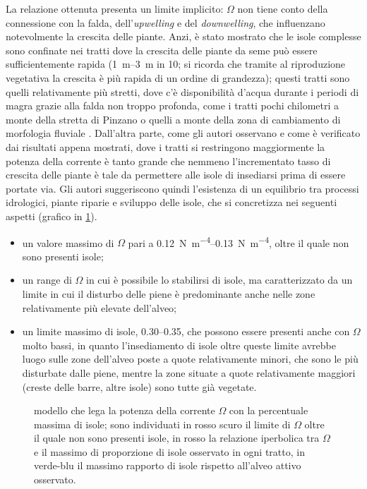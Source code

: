 La relazione ottenuta presenta un limite implicito: $\Omega$ non tiene conto della connessione con la falda, dell'\emph{upwelling} e del \emph{downwelling}, che influenzano notevolmente la crescita delle piante.
Anzi, è stato mostrato che le isole complesse sono confinate nei tratti dove la crescita delle piante da seme può essere sufficientemente rapida (\SIrange[range-phrase={-}]{1}{3}{\m} in \SI{10}{\anni}; si ricorda che tramite al riproduzione vegetativa la crescita è più rapida di un ordine di grandezza); questi tratti sono quelli relativamente più stretti, dove c'è disponibilità d'acqua durante i periodi di magra grazie alla falda non troppo profonda, come i tratti pochi chilometri a monte della stretta di Pinzano o quelli a monte della zona di cambiamento di morfologia fluviale .
Dall'altra parte, come gli autori osservano e come è verificato dai risultati appena mostrati, dove i tratti si restringono maggiormente la potenza della corrente è tanto grande che nemmeno l'incrementato tasso di crescita delle piante è tale da permettere alle isole di insediarsi prima di essere portate via.
Gli autori suggeriscono quindi l'esistenza di un equilibrio tra processi idrologici, piante riparie e sviluppo delle isole, che si concretizza nei seguenti aspetti (grafico in \cref{graph:omega-area-percentuale-linear-modello}).
%
\begin{itemize}
	\item un valore massimo di $\Omega$ pari a \SIrange[range-phrase={-}]{0.12}{0.13}{\newton\per\metre\tothe{4}}, oltre il quale non sono presenti isole;
	\item un range di $\Omega$ in cui è possibile lo stabilirsi di isole, ma caratterizzato da un limite in cui il disturbo delle piene è predominante anche nelle zone relativamente più elevate dell'alveo;
	\item un limite massimo di isole, \numrange[range-phrase={-}]{0.30}{0.35}, che possono essere presenti anche con $\Omega$ molto bassi, in quanto l'insediamento di isole oltre queste limite avrebbe luogo sulle zone dell'alveo poste a quote relativamente minori, che sono le più disturbate dalle piene, mentre la zone situate a quote relativamente maggiori (creste delle barre, altre isole) sono tutte già vegetate.
\end{itemize}
%
%
\begin{figure}
	\centering
	
	\caption[modello che lega la potenza della corrente con la percentuale massima di isole]{modello che lega la potenza della corrente $\Omega$ con la percentuale massima di isole; sono individuati in rosso scuro il limite di $\Omega$ oltre il quale non sono presenti isole, in rosso la relazione iperbolica tra $\Omega$ e il massimo di proporzione di isole osservato in ogni tratto, in verde-blu il massimo rapporto di isole rispetto all'alveo attivo osservato.}
	\label{graph:omega-area-percentuale-linear-modello}
\end{figure}
%
